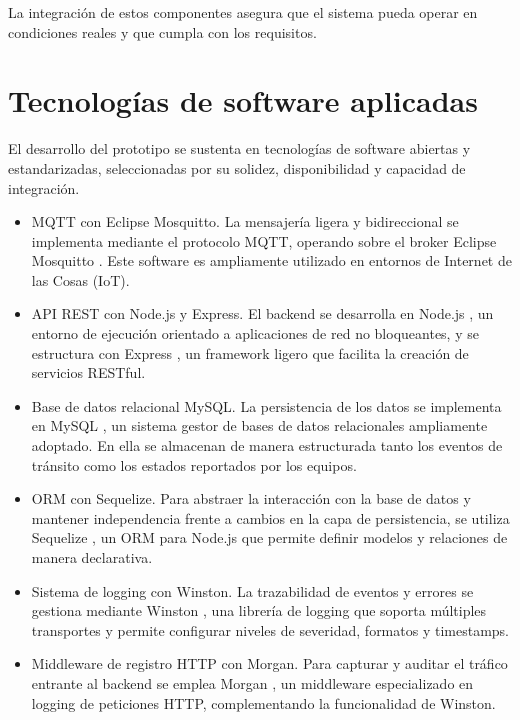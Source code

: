 La integración de estos componentes asegura que el sistema pueda operar en condiciones reales y que cumpla con los requisitos.


\section{Tecnologías de software aplicadas}
El desarrollo del prototipo se sustenta en tecnologías de software abiertas y estandarizadas, seleccionadas por su solidez, disponibilidad y capacidad de integración.

\begin{itemize}

\item MQTT con Eclipse Mosquitto. 
La mensajería ligera y bidireccional se implementa mediante el protocolo MQTT, operando sobre el broker Eclipse Mosquitto \cite{mosquitto}. Este software es ampliamente utilizado en entornos de Internet de las Cosas (IoT).

\item API REST con Node.js  y Express. 
El backend se desarrolla en Node.js \cite{nodejs}, un entorno de ejecución orientado a aplicaciones de red no bloqueantes, y se estructura con Express \cite{expressjs}, un framework ligero que facilita la creación de servicios RESTful.

\item Base de datos relacional MySQL. 
La persistencia de los datos se implementa en MySQL \cite{mysql}, un sistema gestor de bases de datos relacionales ampliamente adoptado. En ella se almacenan de manera estructurada tanto los eventos de tránsito como los estados reportados por los equipos.

\item ORM con Sequelize.
Para abstraer la interacción con la base de datos y mantener independencia frente a cambios en la capa de persistencia, se utiliza Sequelize \cite{sequelize}, un ORM para Node.js que permite definir modelos y relaciones de manera declarativa.  

\item Sistema de logging con Winston.
La trazabilidad de eventos y errores se gestiona mediante Winston \cite{winston}, una librería de logging que soporta múltiples transportes y permite configurar niveles de severidad, formatos y timestamps.  

\item Middleware de registro HTTP con Morgan.
Para capturar y auditar el tráfico entrante al backend se emplea Morgan \cite{morgan}, un middleware especializado en logging de peticiones HTTP, complementando la funcionalidad de Winston.  


\end{itemize}

